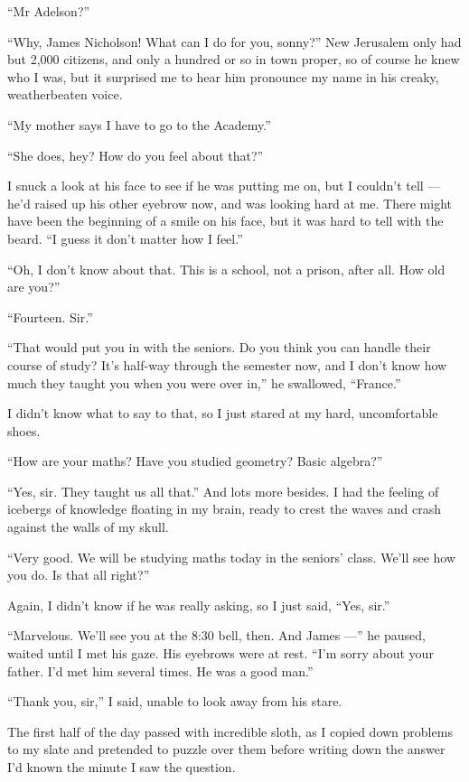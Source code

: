``Mr Adelson?''

``Why, James Nicholson! What can I do for you, sonny?'' New
Jerusalem only had but 2,000 citizens, and only a hundred or so in
town proper, so of course he knew who I was, but it surprised me to
hear him pronounce my name in his creaky, weatherbeaten voice.

``My mother says I have to go to the Academy.''

``She does, hey? How do you feel about that?''

I snuck a look at his face to see if he was putting me on, but I
couldn't tell --- he'd raised up his other eyebrow now, and was
looking hard at me. There might have been the beginning of a smile
on his face, but it was hard to tell with the beard.
``I guess it don't matter how I feel.''

``Oh, I don't know about that. This is a school, not a prison, after all. How 
old are you?''

``Fourteen. Sir.''

``That would put you in with the seniors. Do you think you can handle their 
course of study? It's half-way through the semester now, and I don't know how 
much they taught you when you were over in,''
he swallowed, ``France.''

I didn't know what to say to that, so I just stared at my hard,
uncomfortable shoes.

``How are your maths? Have you studied geometry? Basic algebra?''

``Yes, sir. They taught us all that.'' And lots more besides. I had
the feeling of icebergs of knowledge floating in my brain, ready to
crest the waves and crash against the walls of my skull.

``Very good. We will be studying maths today in the seniors' class. We'll see 
how you do. Is that all right?''

Again, I didn't know if he was really asking, so I just said,
``Yes, sir.''

``Marvelous. We'll see you at the 8:30 bell, then. And James ---''
he paused, waited until I met his gaze. His eyebrows were at rest.
``I'm sorry about your father. I'd met him several times. He was a good man.''

``Thank you, sir,'' I said, unable to look away from his stare.

\tb

The first half of the day passed with incredible sloth, as I copied
down problems to my slate and pretended to puzzle over them before
writing down the answer I'd known the minute I saw the question.

